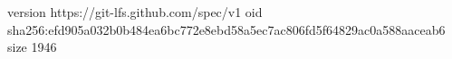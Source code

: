 version https://git-lfs.github.com/spec/v1
oid sha256:efd905a032b0b484ea6bc772e8ebd58a5ec7ac806fd5f64829ac0a588aaceab6
size 1946
